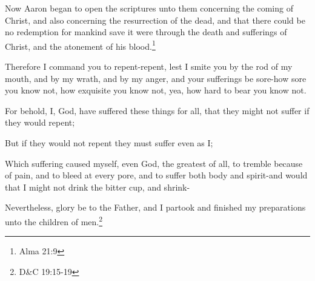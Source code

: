 \begin{displayquote}
Now Aaron began to open the scriptures unto them concerning the coming of Christ, 
and also concerning the resurrection of the dead, and that there could be no 
redemption for mankind save it were through the death and sufferings of Christ, 
and the atonement of his blood.\footnote{Alma 21:9}
\end{displayquote}

\begin{displayquote}
Therefore I command you to repent-repent, lest I smite you by the rod of my mouth, 
and by my wrath, and by my anger, and your sufferings be sore-how sore you know not, 
how exquisite you know not, yea, how hard to bear you know not.

For behold, I, God, have suffered these things for all, that they might not suffer 
if they would repent;

But if they would not repent they must suffer even as I;

Which suffering caused myself, even God, the greatest of all, to tremble because of 
pain, and to bleed at every pore, and to suffer both body and spirit-and would that 
I might not drink the bitter cup, and shrink-

Nevertheless, glory be to the Father, and I partook and finished my preparations 
unto the children of men.\footnote{D\&C 19:15-19}
\end{displayquote}
